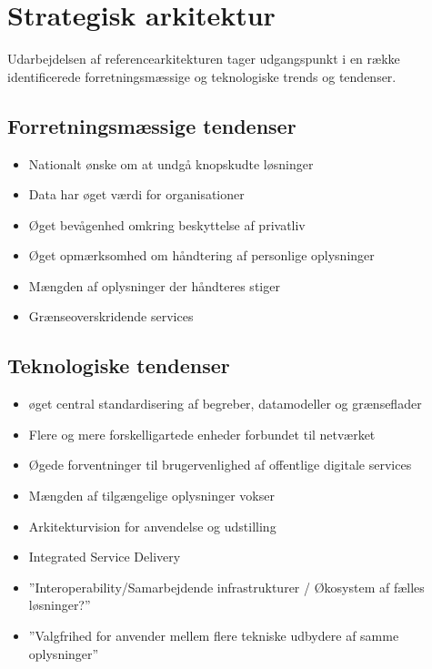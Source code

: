 \section{Strategisk arkitektur}\label{strategisk-arkitektur}

Udarbejdelsen af referencearkitekturen tager udgangspunkt i en række
identificerede forretningsmæssige og teknologiske trends og tendenser.

\subsection{Forretningsmæssige
tendenser}\label{forretningsmuxe6ssige-tendenser}

\begin{itemize}
\tightlist
\item
  Nationalt ønske om at undgå knopskudte løsninger
\item
  Data har øget værdi for organisationer
\item
  Øget bevågenhed omkring beskyttelse af privatliv
\item
  Øget opmærksomhed om håndtering af personlige oplysninger
\item
  Mængden af oplysninger der håndteres stiger
\item
  Grænseoverskridende services
\end{itemize}

\subsection{Teknologiske tendenser}\label{teknologiske-tendenser}

\begin{itemize}
\tightlist
\item
  øget central standardisering af begreber, datamodeller og grænseflader
\item
  Flere og mere forskelligartede enheder forbundet til netværket
\item
  Øgede forventninger til brugervenlighed af offentlige digitale
  services
\item
  Mængden af tilgængelige oplysninger vokser
\item
  Arkitekturvision for anvendelse og udstilling
\item
  Integrated Service Delivery
\item
  ''Interoperability/Samarbejdende infrastrukturer / Økosystem af fælles
  løsninger?''
\item
  ''Valgfrihed for anvender mellem flere tekniske udbydere af samme
  oplysninger''
\end{itemize}

